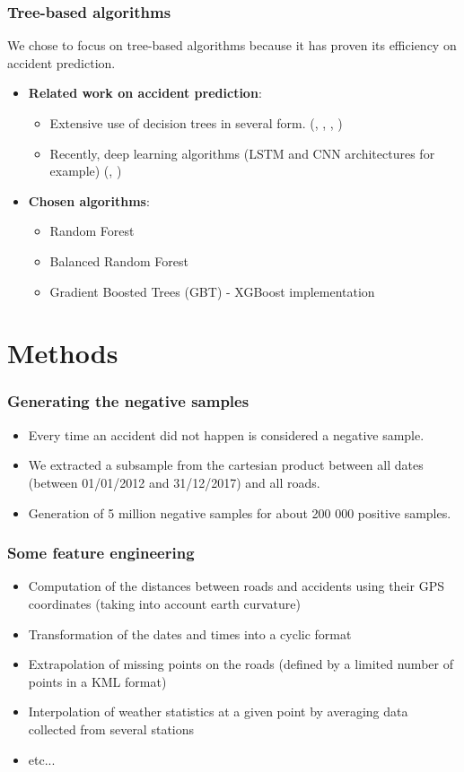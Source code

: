 \documentclass[slidestop,compress,red,mathserif]{beamer}
\begin{document}
\begin{frame}
\frametitle{Tree-based algorithms}
We chose to focus on tree-based algorithms because it has proven its efficiency on accident prediction.
\begin{itemize}
\item[] \textbf{Related work on accident prediction}:
  \begin{itemize}
    \item Extensive use of decision trees in several form. (\cite{Theofilatos2017}, \cite{Abellan2013}, \cite{Lin2015}, \cite{Chang2005})
    \item Recently, deep learning algorithms (LSTM and CNN architectures for example) (\cite{Yuan2018}, \cite{Chen2016})
  \end{itemize}
\item[] \textbf{Chosen algorithms}:
  \begin{itemize}
  	\item Random Forest
    \item Balanced Random Forest
    \item Gradient Boosted Trees (GBT) - XGBoost implementation
  \end{itemize}
\end{itemize}
\end{frame}


\section{Methods}

\begin{frame}
	\frametitle{Generating the negative samples}
	\begin{itemize}
    \item Every time an accident did not happen is considered a negative sample.
		\item We extracted a subsample from the cartesian product between all dates (between 01/01/2012 and 31/12/2017) and all roads.
		\item Generation of 5 million negative samples for about 200 000 positive samples.
	\end{itemize}
\end{frame}

\begin{frame}
	\frametitle{Some feature engineering}
	\begin{itemize}
		\item Computation of the distances between roads and accidents using their GPS coordinates (taking into account earth curvature)
		\item Transformation of the dates and times into a cyclic format
		\item Extrapolation of missing points on the roads (defined by a limited number of points in a KML format)
    \item Interpolation of weather statistics at a given point by averaging data collected from several stations
    \item etc...
	\end{itemize}
\end{frame}
\end{document}
